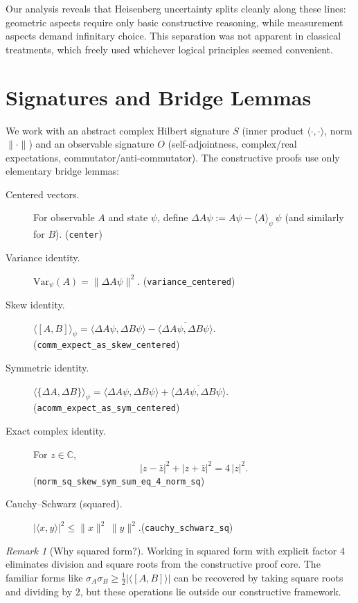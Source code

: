 \documentclass[11pt]{article}
\newcommand{\lean}[1]{\texttt{#1}}
\newcommand{\C}{\mathbb{C}}
\newcommand{\ip}[2]{\langle #1, #2 \rangle}
\newcommand{\E}[1]{\langle #1 \rangle}
\newcommand{\comm}[2]{[#1, #2]}
\newcommand{\acomm}[2]{\{#1, #2\}} %
\newcommand{\absC}[1]{\left| #1 \right|}
\newcommand{\abssq}[1]{\absC{#1}^{2}}
\newcommand{\Var}{\mathrm{Var}}
\theoremstyle{plain}
\theoremstyle{definition}
\theoremstyle{remark}
\newtheorem{remark}[theorem]{Remark}
\begin{document}
Our analysis reveals that Heisenberg uncertainty splits cleanly along these lines: geometric aspects require only basic constructive reasoning, while measurement aspects demand infinitary choice. This separation was not apparent in classical treatments, which freely used whichever logical principles seemed convenient.

\section{Signatures and Bridge Lemmas}
\label{sec:signatures-bridges}

We work with an abstract complex Hilbert signature $S$ (inner product $\ip{\cdot}{\cdot}$, norm $\|\cdot\|$) and an observable signature $O$ (self-adjointness, complex/real expectations, commutator/anti-commutator). The constructive proofs use only elementary bridge lemmas:

\begin{description}
  \item[Centered vectors.] For observable $A$ and state $\psi$, define
  $\Delta A\psi := A\psi - \E{A}_\psi\,\psi$ (and similarly for $B$). \hfill{\small(\lean{center})}
  \item[Variance identity.] $\Var_\psi(A) = \|\Delta A\psi\|^2$. \hfill{\small(\lean{variance\_centered})}
  \item[Skew identity.] $\E{\comm{A}{B}}_\psi = \ip{\Delta A\psi}{\Delta B\psi} - \overline{\ip{\Delta A\psi}{\Delta B\psi}}$. \hfill{\small(\lean{comm\_expect\_as\_skew\_centered})}
  \item[Symmetric identity.] $\E{\acomm{\Delta A}{\Delta B}}_\psi = \ip{\Delta A\psi}{\Delta B\psi} + \overline{\ip{\Delta A\psi}{\Delta B\psi}}$. \hfill{\small(\lean{acomm\_expect\_as\_sym\_centered})}
  \item[Exact complex identity.] For $z\in\C$,
  \[
    \abssq{z-\bar z} + \abssq{z+\bar z} = 4\,\abssq{z}.
  \]
  \hfill{\small(\lean{norm\_sq\_skew\_sym\_sum\_eq\_4\_norm\_sq})}
  \item[Cauchy--Schwarz (squared).] $\abssq{\ip{x}{y}} \le \|x\|^2\,\|y\|^2$.\hfill{\small(\lean{cauchy\_schwarz\_sq})}
\end{description}

\begin{remark}[Why squared form?]
Working in squared form with explicit factor $4$ eliminates division and square roots from the constructive proof core. The familiar forms like $\sigma_A \sigma_B \geq \frac{1}{2}|\langle[A,B]\rangle|$ can be recovered by taking square roots and dividing by $2$, but these operations lie outside our constructive framework.
\end{remark}
\end{document}
